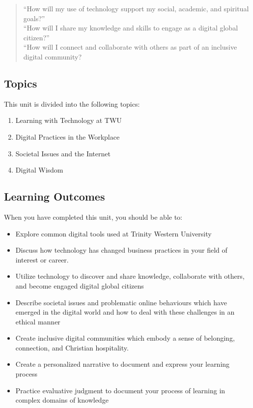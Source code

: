 \documentclass[
]{book}
\providecommand{\tightlist}{%
  \setlength{\itemsep}{0pt}\setlength{\parskip}{0pt}}
\theoremstyle{definition}
\theoremstyle{definition}
\theoremstyle{definition}
\theoremstyle{definition}
\theoremstyle{remark}
\begin{document}
\begin{quote}
``How will my use of technology support my social, academic, and spiritual goals?''\\
``How will I share my knowledge and skills to engage as a digital global citizen?''\\
``How will I connect and collaborate with others as part of an inclusive digital community?
\end{quote}

\hypertarget{topics-5}{%
\subsection*{Topics}\label{topics-5}}

This unit is divided into the following topics:

\begin{enumerate}
\def\labelenumi{\arabic{enumi}.}
\tightlist
\item
  Learning with Technology at TWU\\
\item
  Digital Practices in the Workplace\\
\item
  Societal Issues and the Internet\\
\item
  Digital Wisdom
\end{enumerate}

\hypertarget{learning-outcomes-5}{%
\subsection*{Learning Outcomes}\label{learning-outcomes-5}}

When you have completed this unit, you should be able to:

\begin{itemize}
\tightlist
\item
  Explore common digital tools used at Trinity Western University
\item
  Discuss how technology has changed business practices in your field of interest or career.\\
\item
  Utilize technology to discover and share knowledge, collaborate with others, and become engaged digital global citizens\\
\item
  Describe societal issues and problematic online behaviours which have emerged in the digital world and how to deal with these challenges in an ethical manner\\
\item
  Create inclusive digital communities which embody a sense of belonging, connection, and Christian hospitality.
\item
  Create a personalized narrative to document and express your learning process
\item
  Practice evaluative judgment to document your process of learning in complex domains of knowledge
\end{itemize}
\end{document}
